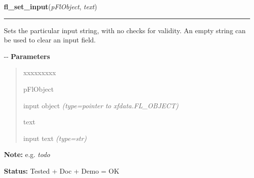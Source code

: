     \label{xformslib:flinput:fl_set_input}

    \vspace{0.5ex}

\hspace{.8\funcindent}\begin{boxedminipage}{\funcwidth}

    \raggedright \textbf{fl\_set\_input}(\textit{pFlObject}, \textit{text})

    \vspace{-1.5ex}

    \rule{\textwidth}{0.5\fboxrule}
\setlength{\parskip}{2ex}

Sets the particular input string, with no checks for validity. An
empty string can be used to clear an input field.

-{}-
\setlength{\parskip}{1ex}
      \textbf{Parameters}
      \vspace{-1ex}

      \begin{quote}
        \begin{Ventry}{xxxxxxxxx}

          \item[pFlObject]


input object
            {\it (type=pointer to xfdata.FL\_OBJECT)}

          \item[text]


input text
            {\it (type=str)}

        \end{Ventry}

      \end{quote}

\textbf{Note:} 
e.g. \emph{todo}


\textbf{Status:} 
Tested + Doc + Demo = OK


    \end{boxedminipage}

    \label{xformslib:flinput:fl_set_input_color}

    \vspace{0.5ex}

